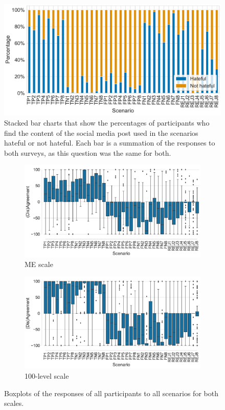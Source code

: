 %
\begin{figure}[h]
    \centering
    \includegraphics[width=.8\textwidth]{Figures/hatefulness.pdf}
    \caption{Stacked bar charts that show the percentages of participants who find the content of the social media post used in the scenarios hateful or not hateful. Each bar is a summation of the responses to both surveys, as this question was the same for both.}
    \label{fig:hatefulness}
\end{figure}
\begin{figure}[h]
    \centering
    \begin{subfigure}[b]{.8\textwidth}
        \centering
        \includegraphics[width=\linewidth]{Figures/boxplots-ME.pdf}
        \caption{ME scale}
        \label{fig:boxplots-me}
    \end{subfigure}
    \begin{subfigure}[b]{.8\textwidth}
        \centering
        \includegraphics[width=\linewidth]{Figures/boxplots-100-level.pdf}
        \caption{100-level scale}
        \label{fig:boxplots-100-level}
    \end{subfigure}
    \caption{Boxplots of the responses of all participants to all scenarios for both scales.}
    \label{fig:boxplots}
\end{figure}

